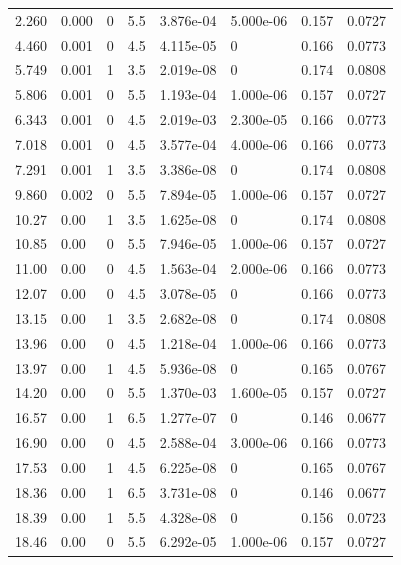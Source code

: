 \documentclass[preview]{standalone}
\begin{document}
{{\begin{tabular}{L{1.2cm}C{1.2cm} C{0.3cm}C{0.5cm} C{1.4cm}C{1.4cm} C{1.4cm}C{1.4cm}}
  2.260  &  0.000  & 0     & 5.5 &  3.876e-04  & 5.000e-06  & 0.157 &  0.0727   \\ 
  4.460  &  0.001  & 0     & 4.5 &  4.115e-05  & 0  & 0.166 &  0.0773   \\ 
  5.749  &  0.001  & 1     & 3.5 &  2.019e-08  & 0  & 0.174 &  0.0808   \\ 
  5.806  &  0.001  & 0     & 5.5 &  1.193e-04  & 1.000e-06  & 0.157 &  0.0727   \\ 
  6.343  &  0.001  & 0     & 4.5 &  2.019e-03  & 2.300e-05  & 0.166 &  0.0773   \\ 
  7.018  &  0.001  & 0     & 4.5 &  3.577e-04  & 4.000e-06  & 0.166 &  0.0773   \\ 
  7.291  &  0.001  & 1     & 3.5 &  3.386e-08  & 0  & 0.174 &  0.0808   \\ 
  9.860  &  0.002  & 0     & 5.5 &  7.894e-05  & 1.000e-06  & 0.157 &  0.0727   \\ 
  10.27  &  0.00  & 1     & 3.5 &  1.625e-08  & 0  & 0.174 &  0.0808   \\ 
  10.85  &  0.00  & 0     & 5.5 &  7.946e-05  & 1.000e-06  & 0.157 &  0.0727   \\ 
  11.00  &  0.00  & 0     & 4.5 &  1.563e-04  & 2.000e-06  & 0.166 &  0.0773   \\ 
  12.07  &  0.00  & 0     & 4.5 &  3.078e-05  & 0  & 0.166 &  0.0773   \\ 
  13.15  &  0.00  & 1     & 3.5 &  2.682e-08  & 0  & 0.174 &  0.0808   \\ 
  13.96  &  0.00  & 0     & 4.5 &  1.218e-04  & 1.000e-06  & 0.166 &  0.0773   \\ 
  13.97  &  0.00  & 1     & 4.5 &  5.936e-08  & 0  & 0.165 &  0.0767   \\ 
  14.20  &  0.00  & 0     & 5.5 &  1.370e-03  & 1.600e-05  & 0.157 &  0.0727   \\ 
  16.57  &  0.00  & 1     & 6.5 &  1.277e-07  & 0  & 0.146 &  0.0677   \\ 
  16.90  &  0.00  & 0     & 4.5 &  2.588e-04  & 3.000e-06  & 0.166 &  0.0773   \\ 
  17.53  &  0.00  & 1     & 4.5 &  6.225e-08  & 0  & 0.165 &  0.0767   \\ 
  18.36  &  0.00  & 1     & 6.5 &  3.731e-08  & 0  & 0.146 &  0.0677   \\ 
  18.39  &  0.00  & 1     & 5.5 &  4.328e-08  & 0  & 0.156 &  0.0723   \\ 
  18.46  &  0.00  & 0     & 5.5 &  6.292e-05  & 1.000e-06  & 0.157 &  0.0727   \\ 

\end{tabular}}}
\end{document}
